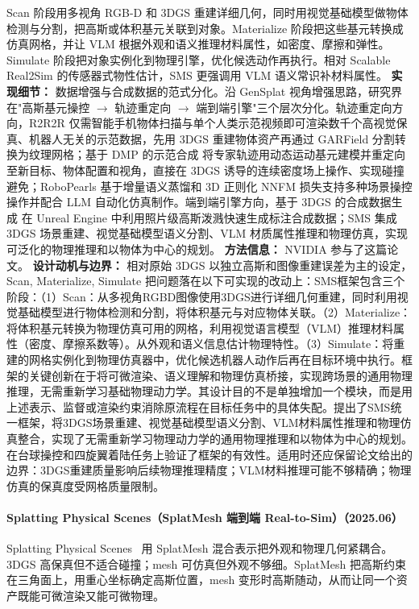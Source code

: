 Scan 阶段用多视角 RGB-D 和 3DGS 重建详细几何，同时用视觉基础模型做物体检测与分割，把高斯或体积基元关联到对象。Materialize 阶段把这些基元转换成仿真网格，并让 VLM 根据外观和语义推理材料属性，如密度、摩擦和弹性。Simulate 阶段把对象实例化到物理引擎，优化候选动作再执行。相对 Scalable Real2Sim 的传感器式物性估计，SMS 更强调用 VLM 语义常识补材料属性。
\textbf{实现细节：} 数据增强与合成数据的范式分化。沿 GenSplat 视角增强思路，研究界在"高斯基元操控 $\to$ 轨迹重定向 $\to$ 端到端引擎"三个层次分化。轨迹重定向方向，R2R2R 仅需智能手机物体扫描与单个人类示范视频即可渲染数千个高视觉保真、机器人无关的示范数据，先用 3DGS 重建物体资产再通过 GARField 分割转换为纹理网格；基于 DMP 的示范合成 将专家轨迹用动态运动基元建模并重定向至新目标、物体配置和视角，直接在 3DGS 诱导的连续密度场上操作、实现碰撞避免；RoboPearls 基于增量语义蒸馏和 3D 正则化 NNFM 损失支持多种场景操控操作并配合 LLM 自动化仿真制作。端到端引擎方向，基于 3DGS 的合成数据生成 在 Unreal Engine 中利用照片级高斯泼溅快速生成标注合成数据；SMS 集成 3DGS 场景重建、视觉基础模型语义分割、VLM 材质属性推理和物理仿真，实现可泛化的物理推理和以物体为中心的规划。
\textbf{方法信息：} NVIDIA 参与了这篇论文。
\textbf{设计动机与边界：} 相对原始 3DGS 以独立高斯和图像重建误差为主的设定，Scan, Materialize, Simulate 把问题落在以下可实现的改动上：SMS框架包含三个阶段：（1）Scan：从多视角RGBD图像使用3DGS进行详细几何重建，同时利用视觉基础模型进行物体检测和分割，将体积基元与对应物体关联。（2）Materialize：将体积基元转换为物理仿真可用的网格，利用视觉语言模型（VLM）推理材料属性（密度、摩擦系数等）。从外观和语义信息估计物理特性。（3）Simulate：将重建的网格实例化到物理仿真器中，优化候选机器人动作后再在目标环境中执行。框架的关键创新在于将可微渲染、语义理解和物理仿真桥接，实现跨场景的通用物理推理，无需重新学习基础物理动力学。其设计目的不是单独增加一个模块，而是用上述表示、监督或渲染约束消除原流程在目标任务中的具体失配。提出了SMS统一框架，将3DGS场景重建、视觉基础模型语义分割、VLM材料属性推理和物理仿真整合，实现了无需重新学习物理动力学的通用物理推理和以物体为中心的规划。在台球操控和四旋翼着陆任务上验证了框架的有效性。适用时还应保留论文给出的边界：3DGS重建质量影响后续物理推理精度；VLM材料推理可能不够精确；物理仿真的保真度受网格质量限制。
\paragraph{Splatting Physical Scenes（SplatMesh 端到端 Real-to-Sim）（2025.06）}
Splatting Physical Scenes~\cite{2506_04120} 用 SplatMesh 混合表示把外观和物理几何紧耦合。3DGS 高保真但不适合碰撞；mesh 可仿真但外观不够细。SplatMesh 把高斯约束在三角面上，用重心坐标确定高斯位置，mesh 变形时高斯随动，从而让同一个资产既能可微渲染又能可微物理。

